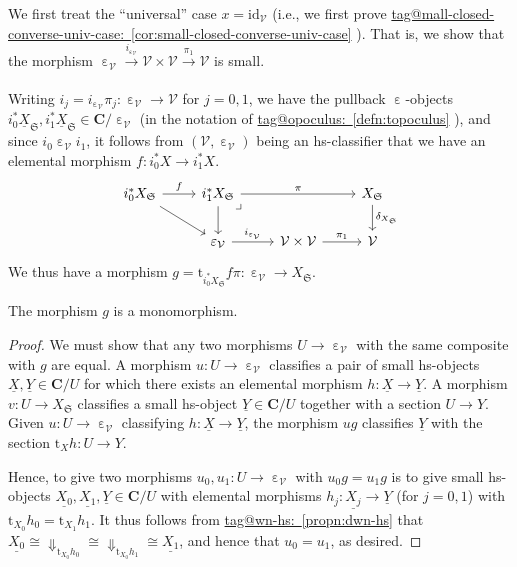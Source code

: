 \documentclass{amsart}
\makeatletter
\newcommand\bC{\mathbf{C}}
\newcommand\cV{\mathcal{V}}
\newcommand\Dwn{{\Downarrow}}
\newcommand\ein{\mathrel{\varepsilon}}
\newcommand\fS{\mathfrak{S}}
\newcommand\id{\mathrm{id}}
\newcommand\pb[1][rd]{\ar[#1, phantom, "\lrcorner", pos=0]}
\newcommand\rt{\mathrm{t}}
\newcommand\tox[2][]{\xrightarrow[#1]{#2}}
\newcommand\und[1]{\underline{#1}}
\newcommand\unein{{\ein}}
\newcommand\tagword[1]{\csname tag@#1\endcsname}
\def\label@tag#1:#2\@nil{#1}
\newcommand\labeltag[1]{\label@tag#1:\@nil}
\newcommand\jref[1]{%
  \texorpdfstring%
    {\hyperref[#1]{\tagword{\labeltag{#1}}~\ref*{#1}}}%
    {\tagword{\labeltag{#1}}~\ref*{#1}}%
}
\theoremstyle{definition}
\theoremstyle{remark}
\theoremstyle{plainwithref}
\makeatother
\begin{document}
We first treat the ``universal'' case \( x = \id_{\cV} \) (i.e., we first prove \jref{cor:small-closed-converse-univ-case}).
That is, we show that the morphism \( {\ein_{\cV}} \tox{i_{\ein_\cV}} \cV \times \cV \tox{\pi_1} \cV \) is small.

Writing \( i_j = i_{\unein_{\cV}} \pi_j \colon \unein_{\cV} \to \cV \) for \( j = 0,1 \), we have the pullback \( \unein \)-objects \( i_0^* \und X_\fS, i_1^* \und X_\fS \in \bC / \unein_{\cV} \) (in the notation of \jref{defn:topoculus}), and since \( i_0 \ein_\cV i_1 \), it follows from \( (\cV, \unein_\cV) \) being an hs-classifier that we have an elemental morphism \( f \colon i_0^* X \to i_1^* X \).
\[
  \begin{tikzcd}
    i_0^* X_\fS \ar[r, "f"] \ar[dr] & i_1^* X_\fS \ar[rr, "\pi"] \ar[d] \pb & & X_\fS \ar[d, "\delta_{X_\fS}"] \\
    {} & \ein_{\cV} \ar[r, "i_{\ein_{\cV}}"] & \cV \times \cV \ar[r, "\pi_1"] & \cV
  \end{tikzcd}
\]
We thus have a morphism \( g = \rt_{i_0^* X_\fS} f \pi \colon \unein_{\cV} \to X_{\fS} \).

\begin{claim}
  The morphism \( g \) is a monomorphism.
\end{claim}

\begin{proof}
  We must show that any two morphisms \( U \to {\ein_{\cV}} \) with the same composite with \( g \) are equal.
  A morphism \( u \colon U \to {\ein_{\cV}} \) classifies a pair of small hs-objects \( \und X,\und Y \in \bC / U \) for which there exists an elemental morphism \( h \colon \und X \to \und Y \).
  A morphism \( v \colon U \to X_{\fS} \) classifies a small hs-object \( \und Y \in \bC / U \) together with a section \( U \to Y \).
  Given \( u \colon U \to {\ein_{\cV}} \) classifying \( h \colon \und X \to \und Y \), the morphism \( u g \) classifies \( \und Y \) with the section \( \rt_X h \colon U \to Y \).

  Hence, to give two morphisms \( u_0,u_1 \colon U \to {\ein_{\cV}} \) with \( u_0 g = u_1 g \) is to give small hs-objects \( \und{X_0},\und{X_1},\und Y \in \bC / U \) with elemental morphisms \( h_j \colon \und{X_j} \to \und Y \) (for \( j = 0,1 \)) with \( \rt_{X_0} h_0 = \rt_{X_1} h_1 \).
  It thus follows from \jref{propn:dwn-hs} that \( \und{X_0} \cong \Dwn_{\rt_{X_0} h_0} \cong \Dwn_{\rt_{X_0} h_1} \cong \und{X_1} \), and hence that \( u_0 = u_1 \), as desired.
\end{proof}
\end{document}
